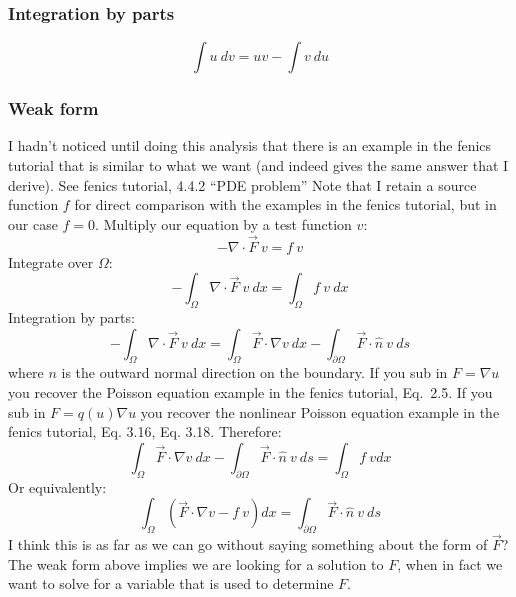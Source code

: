\subsubsection{Integration by parts}
\begin{equation}
\int u\ dv = uv - \int  v\ du
\end{equation}

\subsubsection{Weak form}
I hadn't noticed until doing this analysis that there is an example in the fenics tutorial that is similar to what we want (and indeed gives the same answer that I derive).  See fenics tutorial, 4.4.2 ``PDE problem''
Note that I retain a source function $f$ for direct comparison with the examples in the fenics tutorial, but in our case $f=0$.  Multiply our equation by a test function $v$:
\begin{equation}
- \nabla \cdot \vec{F}\ v = f\ v
\end{equation}
Integrate over $\Omega$:
\begin{equation}
- \int_\Omega \nabla \cdot \vec{F}\ v\ dx = \int_\Omega f\ v\ dx
\end{equation}
Integration by parts:
\begin{equation}
- \int_\Omega \nabla \cdot \vec{F}\ v\ dx = \int_\Omega \vec{F} \cdot \nabla v\ dx - \int_{\partial \Omega} \vec{F} \cdot \hat{n}\ v\ ds
\end{equation}
where $n$ is the outward normal direction on the boundary.  If you sub in $F=\nabla u$ you recover the Poisson equation example in the fenics tutorial, Eq.~2.5.  If you sub in $F=q(u) \nabla u$ you recover the nonlinear Poisson equation example in the fenics tutorial, Eq. 3.16, Eq. 3.18.  Therefore:
\begin{equation}
\int_\Omega \vec{F} \cdot \nabla v\ dx - \int_{\partial \Omega} \vec{F} \cdot \hat{n}\ v\ ds = \int_\Omega f\ v dx
\end{equation}
Or equivalently:
\begin{equation}
\int_\Omega (\vec{F} \cdot \nabla v - f\ v) dx = \int_{\partial \Omega} \vec{F} \cdot \hat{n}\ v\ ds
\end{equation}
I think this is as far as we can go without saying something about the form of $\vec{F}$?  The weak form above implies we are looking for a solution to $F$, when in fact we want to solve for a variable that is used to determine $F$.


